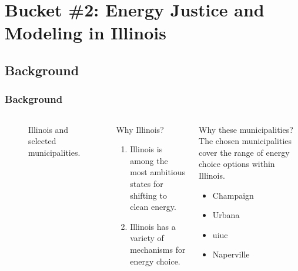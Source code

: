 \section{Bucket \#2: Energy Justice and Modeling in Illinois}

\subsection{Background}


\begin{frame}
    \frametitle{Background}
        
    \begin{columns}
        \column[t]{2.5cm}
        \begin{figure}
            \centering
            \resizebox{\columnwidth}{!}{}
            \caption{Illinois and selected municipalities.}
            \label{fig:illinois}
        \end{figure}
        \column[t]{7.5cm}
        \begin{block}{Why Illinois?}
            \begin{enumerate}[<+->]
                \item Illinois is among the most ambitious states for shifting
                to clean energy.
                \item Illinois has a variety of mechanisms for energy choice.
            \end{enumerate}
        \end{block}
        \begin{block}{Why these municipalities?}
            The chosen municipalities cover the range of energy choice options
            within Illinois.
            \begin{itemize}[<+->]
                \item Champaign
                \item Urbana
                \item \gls{uiuc}
                \item Naperville
            \end{itemize}
        \end{block}
    \end{columns}
\end{frame}

